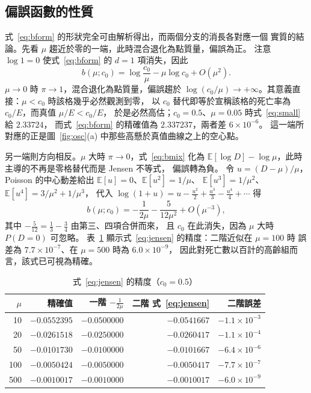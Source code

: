 \documentclass[UTF8, fontset=macnew, a4paper, 12pt]{ctexart}
\newcommand{\Ex}{\mathbb{E}}
\begin{document}
\subsection{偏誤函數的性質}\label{subsec:bprops}

式~\eqref{eq:bform} 的形狀完全可由解析得出，而兩個分支的消長各對應一個
實質的結論。先看 $\mu$ 趨近於零的一端，此時混合退化為點質量，偏誤為正。
注意 $\log 1=0$ 使式~\eqref{eq:bform} 的 $d=1$ 項消失，因此
\begin{equation}\label{eq:small}
b(\mu;c_0)=\log\frac{c_0}{\mu}-\mu\log c_0+O(\mu^2).
\end{equation}
$\mu\to0$ 時 $\pi\to1$，混合退化為點質量，偏誤趨於
$\log(c_0/\mu)\to+\infty$。其意義直接：$\mu<c_0$ 時該格幾乎必然觀測到零，
以 $c_0$ 替代即等於宣稱該格的死亡率為 $c_0/E$，而真值 $\mu/E<c_0/E$，
於是必然高估；$c_0=0.5$、$\mu=0.05$ 時式~\eqref{eq:small} 給 $2.33724$，
而式~\eqref{eq:bform} 的精確值為 $2.337237$，兩者差 $6\times10^{-6}$。
這一端所對應的正是圖~\ref{fig:osc}(a) 中那些高懸於真值曲線之上的空心點。

另一端則方向相反。$\mu$ 大時 $\pi\to0$，式~\eqref{eq:bmix} 化為
$\Ex[\log D]-\log\mu$，此時主導的不再是零格替代而是 Jensen 不等式，
偏誤轉為負。
令 $u=(D-\mu)/\mu$， Poisson 的中心動差給出 $\Ex[u]=0$、$\Ex[u^2]=1/\mu$、
$\Ex[u^3]=1/\mu^2$、$\Ex[u^4]=3/\mu^2+1/\mu^3$，
代入 $\log(1+u)=u-\tfrac{u^2}2+\tfrac{u^3}3-\tfrac{u^4}4+\cdots$ 得
\begin{equation}\label{eq:jensen}
b(\mu;c_0)=-\frac{1}{2\mu}-\frac{5}{12\mu^{2}}+O(\mu^{-3}),
\end{equation}
其中 $-\tfrac5{12}=\tfrac13-\tfrac34$ 由第三、四項合併而來，
且 $c_0$ 在此消失，因為 $\mu$ 大時 $P(D=0)$ 可忽略。
表~\ref{tab:asym} 顯示式~\eqref{eq:jensen} 的精度：二階近似在 $\mu=100$ 時
誤差為 $7.7\times10^{-7}$、在 $\mu=500$ 時為 $6.0\times10^{-9}$，
因此對死亡數以百計的高齡組而言，該式已可視為精確。

\begin{table}[H]
\centering
\caption{式~\eqref{eq:jensen} 的精度（$c_0=0.5$）}
\small
\begin{tabular}{rrrrr}
\toprule
$\mu$ & 精確值 & 一階 $-\frac{1}{2\mu}$ & 二階 式~\eqref{eq:jensen} & 二階誤差\\
\midrule
10   & $-0.0552395$ & $-0.0500000$ & $-0.0541667$ & $-1.1\times10^{-3}$\\
20   & $-0.0261518$ & $-0.0250000$ & $-0.0260417$ & $-1.1\times10^{-4}$\\
50   & $-0.0101730$ & $-0.0100000$ & $-0.0101667$ & $-6.4\times10^{-6}$\\
100  & $-0.0050424$ & $-0.0050000$ & $-0.0050417$ & $-7.7\times10^{-7}$\\
500  & $-0.0010017$ & $-0.0010000$ & $-0.0010017$ & $-6.0\times10^{-9}$\\
\bottomrule
\end{tabular}
\label{tab:asym}
\end{table}
\end{document}
